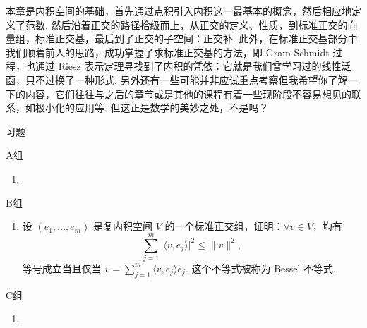 本章是内积空间的基础，首先通过点积引入内积这一最基本的概念，然后相应地定义了范数. 然后沿着正交的路径拾级而上，从正交的定义、性质，到标准正交的向量组，标准正交基，最后到了正交的子空间：正交补. 此外，在标准正交基部分中我们顺着前人的思路，成功掌握了求标准正交基的方法，即 Gram-Schmidt 过程，也通过 Riesz 表示定理寻找到了内积的凭依：它就是我们曾学习过的线性泛函，只不过换了一种形式. 另外还有一些可能并非应试重点考察但我希望你了解一下的内容，它们往往与之后的章节或是其他的课程有着一些现阶段不容易想见的联系，如极小化的应用等. 但这正是数学的美妙之处，不是吗？

\vspace{2ex}
\centerline{\heiti \Large 习题}

\vspace{2ex}
{\kaishu }
\begin{flushright}
    \kaishu

\end{flushright}

\centerline{\heiti A组}
\begin{enumerate}
    \item
\end{enumerate}

\centerline{\heiti B组}
\begin{enumerate}
    \item 设 $ (e_1, \ldots , e_m) $ 是复内积空间 $ V $ 的一个标准正交组，证明：$ \forall v \in V $，均有
          \[ \sum_{j = 1}^{m} \lvert \langle v, e_j \rangle \rvert^2 \leqslant \lVert v \rVert^2, \]
          等号成立当且仅当 $ v = \displaystyle\sum_{j = 1}^{m} \langle v, e_j \rangle e_j $. 这个不等式被称为 Bessel 不等式.
\end{enumerate}

\centerline{\heiti C组}
\begin{enumerate}
    \item
\end{enumerate}

